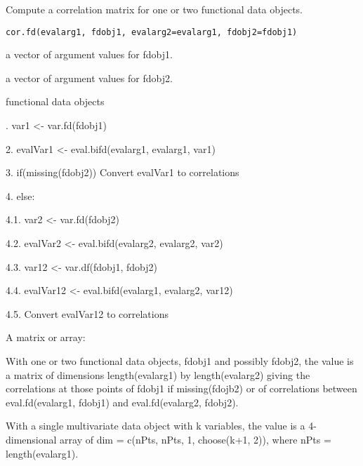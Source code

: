\begin{Description}\relax
Compute a correlation matrix for one or two functional data objects.
\end{Description}
\begin{Usage}
\begin{verbatim}
cor.fd(evalarg1, fdobj1, evalarg2=evalarg1, fdobj2=fdobj1)
\end{verbatim}
\end{Usage}
\begin{Arguments}
\begin{ldescription}
\item[\code{evalarg1}] a vector of argument values for fdobj1.   

\item[\code{evalarg2}] a vector of argument values for fdobj2.  

\item[\code{fdobj1, fdobj2}] functional data objects 

\end{ldescription}
\end{Arguments}
\begin{Details}.  var1 <- var.fd(fdobj1) 

2.  evalVar1 <- eval.bifd(evalarg1, evalarg1, var1)


3.  if(missing(fdobj2)) Convert evalVar1 to correlations


4.  else:  

4.1.  var2 <- var.fd(fdobj2)

4.2.  evalVar2 <- eval.bifd(evalarg2, evalarg2, var2)

4.3.  var12 <- var.df(fdobj1, fdobj2)

4.4.  evalVar12 <- eval.bifd(evalarg1, evalarg2, var12)

4.5.  Convert evalVar12 to correlations
\end{Details}
\begin{Value}
A matrix or array:

With one or two functional data objects, fdobj1 and possibly fdobj2,
the value is a matrix of dimensions length(evalarg1) by length(evalarg2) giving the
correlations at those points of fdobj1 if missing(fdojb2) or of
correlations between eval.fd(evalarg1, fdobj1) and eval.fd(evalarg2,
fdobj2).

With a single multivariate data object with k variables, the value is
a 4-dimensional array of dim = c(nPts, nPts, 1, choose(k+1, 2)), where
nPts = length(evalarg1).
\end{Value}
